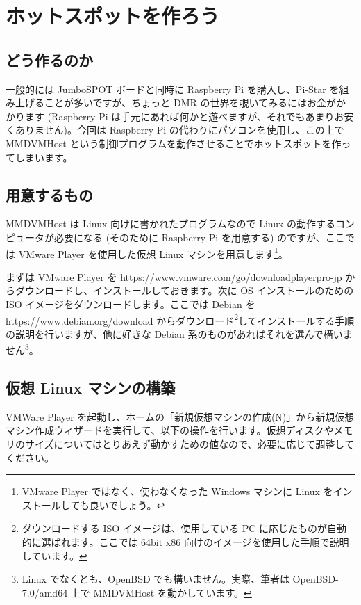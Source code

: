 \documentclass[a4j,oneside]{ujbook}
\begin{document}
\chapter{ホットスポットを作ろう}

\section{どう作るのか}

一般的には JumboSPOT ボードと同時に Raspberry Pi を購入し、Pi-Star を組み上げることが多いですが、ちょっと DMR の世界を覗いてみるにはお金がかかります (Raspberry Pi は手元にあれば何かと遊べますが、それでもあまりお安くありません)。今回は Raspberry Pi の代わりにパソコンを使用し、この上で MMDVMHost という制御プログラムを動作させることでホットスポットを作ってしまいます。

\section{用意するもの}

MMDVMHost は Linux 向けに書かれたプログラムなので Linux の動作するコンピュータが必要になる (そのために Raspberry Pi を用意する) のですが、ここでは VMware Player を使用した仮想 Linux マシンを用意します\footnote{VMware Player ではなく、使わなくなった Windows マシンに Linux をインストールしても良いでしょう。}。

まずは VMware Player を \url{https://www.vmware.com/go/downloadplayerpro-jp} からダウンロードし、インストールしておきます。次に OS インストールのための ISO イメージをダウンロードします。ここでは Debian を \url{https://www.debian.org/download} からダウンロード\footnote{ダウンロードする ISO イメージは、使用している PC に応じたものが自動的に選ばれます。ここでは 64bit x86 向けのイメージを使用した手順で説明しています。}してインストールする手順の説明を行いますが、他に好きな Debian 系のものがあればそれを選んで構いません\footnote{Linux でなくとも、OpenBSD でも構いません。実際、筆者は OpenBSD-7.0/amd64 上で MMDVMHost を動かしています。}。

\section{仮想 Linux マシンの構築}

VMWare Player を起動し、ホームの「新規仮想マシンの作成(N)」から新規仮想マシン作成ウィザードを実行して、以下の操作を行います。仮想ディスクやメモリのサイズについてはとりあえず動かすための値なので、必要に応じて調整してください。
\end{document}
